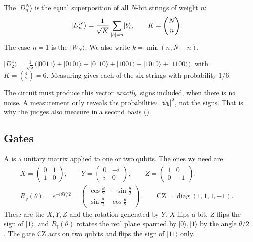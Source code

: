 \documentclass[11pt]{scrartcl}
\newcommand{\ket}[1]{\lvert #1\rangle}
\newcommand{\D}[2]{D^{#1}_{#2}}
\newcommand{\CZ}{\ensuremath{\mathrm{CZ}}}
\begin{document}
\begin{definition}
  The  $\ket{\D Nn}$ is the equal superposition of all $N$-bit strings of weight
  $n$:
  \[
    \ket{\D Nn}=\frac{1}{\sqrt K}\sum_{\abs b=n}\ket b,\qquad K=\binom Nn .
  \]
  The case $n=1$ is the  $\ket{W_N}$. We also write $k=\min(n,N-n)$.
\end{definition}

\begin{example}[$\D42$]
  $\ket{\D42}=\tfrac{1}{\sqrt6}\bigl(\ket{0011}+\ket{0101}+\ket{0110}+\ket{1001}+\ket{1010}+\ket{1100}\bigr)$,
  with $K=\binom42=6$. Measuring gives each of the six strings with probability $1/6$.
\end{example}

The circuit must produce this vector \emph{exactly}, signs included, when there is no noise.
A measurement only reveals the probabilities $\left\lvert \psi_b \right\rvert^2$, not the signs. That is why the
judges also measure in a second basis ().

\subsection{Gates}

A  is a unitary matrix applied to one or two qubits. The ones we need are
\begin{gather*}
  X=\begin{pmatrix}0&1\\1&0\end{pmatrix},\qquad
  Y=\begin{pmatrix}0&-i\\i&0\end{pmatrix},\qquad
  Z=\begin{pmatrix}1&0\\0&-1\end{pmatrix},\\
  R_y(\theta)=e^{-i\theta Y/2}=\begin{pmatrix}\cos\frac\theta2&-\sin\frac\theta2\\[2pt]\sin\frac\theta2&\cos\frac\theta2\end{pmatrix},\qquad
  \CZ=\operatorname{diag}(1,1,1,-1).
\end{gather*}
These are the  $X,Y,Z$ and the rotation generated by $Y$. $X$ flips a bit, $Z$ flips the sign of $\ket1$, and $R_y(\theta)$ rotates the real plane spanned by
$\ket0,\ket1$ by the angle $\theta/2$. The  gate \CZ{} acts on two qubits and
flips the sign of $\ket{11}$ only.
\end{document}
